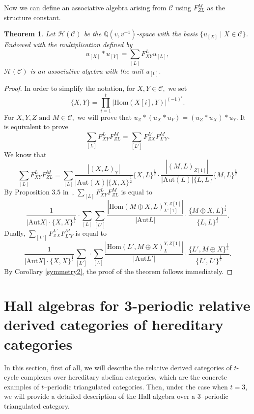 \documentclass{amsart}
\newtheorem{theorem}{Theorem}[section]
\theoremstyle{definition}
\numberwithin{equation}{section}
\begin{document}
Now we can define an associative algebra arising from ${{\mathcal{C}}}$ using
$F_{ZL}^M$ as the structure constant.

\begin{theorem}\label{maintheorem123}
Let $\mathcal{H}({{\mathcal{C}}})$ be the ${{\mathbb Q}}(v, v^{-1})$-space with the basis
$\{u_{[X]}\mid X\in {{\mathcal{C}}}\}$. Endowed with the multiplication defined
by
$$
u_{[X]}*u_{[Y]}=\sum_{[L]}F_{XY}^L u_{[L]},$$ $\mathcal{H}({{\mathcal{C}}})$ is
an associative algebra with the unit  $u_{[0]}.$

\end{theorem}
\begin{proof}
In order to simplify the notation, for $X,Y\in{{\mathcal{C}}},$ we set
$$\{X,Y\}=\prod_{i=1}^t|{\mathrm{Hom}}(X[i],Y)|^{(-1)^{i}}.$$ For $X,Y,Z \mbox{ and }M\in{{\mathcal{C}}},$ we will
prove that $u_Z*(u_X*u_Y)=(u_Z*u_X)*u_Y.$ It is equivalent to prove
$$
\sum_{[L]}F_{XY}^{L}F_{ZL}^{M}=\sum_{[L']}F_{ZX}^{L'}F_{L'Y}^{M}.
$$We know that
$$
\sum_{[L]}F_{XY}^{L}F_{ZL}^{M}=\sum_{[L]}\frac{|(X,L)_Y|}{|\mathrm{Aut}(X)|\{X,X\}^{\frac{1}{2}}}\{X,L\}^{\frac{1}{2}}\cdot
\frac{|(M,L)_{Z[1]}|}{|\mathrm{Aut}(L)|\{L,L\}}\{M,L\}^{\frac{1}{2}}
$$
By Proposition $3.5$ in~\cite{XX2006},
$\displaystyle\sum_{[L]}F_{XY}^{L}F_{ZL}^{M}$ is equal to
$$
\frac{1}{|{\mbox{Aut}}
X|\cdot\{X,X\}^{\frac{1}{2}}}\cdot\sum_{[L]}\sum_{[L']}\frac{|{\mathrm{Hom}}(M\oplus
X,L)^{Y,Z[1]}_{L'[1]}|}{|{\mbox{Aut}} L|}\cdot \frac{\{M\oplus
X,L\}^{\frac{1}{2}}}{\{L,L\}^{\frac{1}{2}}}.
$$
Dually, $\displaystyle\sum_{[L']}F_{ZX}^{L'}F_{L'Y}^{M}$  is equal
to
$$
\frac{1}{|{\mbox{Aut}}
X|\cdot\{X,X\}^{\frac{1}{2}}}\sum_{[L']}\cdot\sum_{[L]}\frac{|{\mathrm{Hom}}(L',M\oplus
X)^{Y,Z[1]}_{L}|}{|{\mbox{Aut}} L'|}\cdot \frac{\{L',M\oplus
X\}^{\frac{1}{2}}}{\{L',L'\}^{\frac{1}{2}}}.
$$
By Corollary \ref{symmetry2}, the proof of the theorem follows
immediately.
\end{proof}

\section{Hall algebras for 3-periodic relative derived categories of hereditary categories}
In this section, first of all, we will describe the relative derived
categories of $t$-cycle complexes over hereditary abelian
categories, which are the concrete examples of $t$--periodic
triangulated categories. Then, under the case when $t=3$, we will
provide a detailed description of the Hall algebra over a
$3$--periodic triangulated category.
\end{document}
